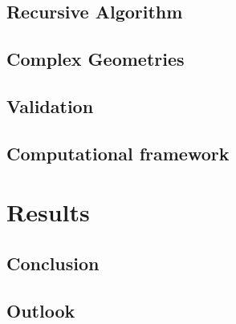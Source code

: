 \section{Recursive \cgfnc{} Algorithm} \label{sec:recursivegreenfncalgorithm}

\section{Complex Geometries}

\section{Validation}

\section{Computational framework}

\chapter{Results}
\section{Conclusion}
\section{Outlook}
\appendix

\clearpage




